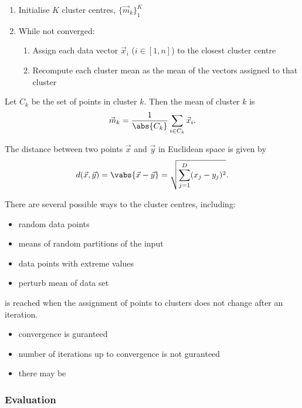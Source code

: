 \documentclass{article}
\begin{document}
\begin{enumerate}
	\item Initialise $K$ cluster centres, $\{\vec m_k\}^K_1$
	\item While not converged: \begin{enumerate}
		\item Assign each data vector $\vec x_i$ ($i\in[1,n]$) to the closest cluster centre
		\item Recompute each cluster mean as the mean of the vectors assigned to that cluster
	\end{enumerate}
\end{enumerate}
\begin{theorem}
	Let $C_k$ be the set of points in cluster $k$. Then the mean of cluster $k$
	is 
	\begin{align*}
		\vec m_k=\frac{1}{\abs{C_k}}\sum_{i\in C_k}\vec x_i.
	\end{align*}
\end{theorem}
\begin{definition}
	The distance between two points $\vec x$ and $\vec y$ in Euclidean space
	is given by
	\begin{align*}
		d(\vec x, \vec y) = \vabs{\vec x - \vec y}=\sqrt{\sum_{j=1}^D(x_j-y_j)^2}.
	\end{align*}
\end{definition}
There are several possible ways to  the cluster centres, including:
\begin{itemize}
	\item random data points
	\item means of random partitions of the input
	\item data points with extreme values
	\item perturb mean of data set 
\end{itemize}
\begin{definition}
	 is reached when the assignment of points to clusters
	does not change after an iteration.
	\begin{itemize}
		\item convergence is guranteed
		\item number of iterations up to convergence is not guranteed
		\item there may be 
	\end{itemize}
\end{definition}

\subsubsection{Evaluation}
\end{document}
